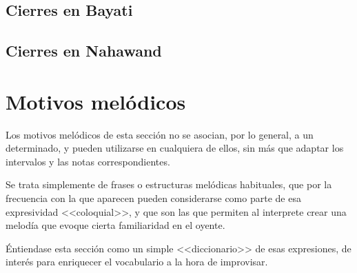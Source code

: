 \subsection{Cierres en \maqam Bayati}
\subsection{Cierres en \maqam Nahawand}

\section{Motivos melódicos}

Los motivos melódicos de esta sección no se asocian, por lo general, a un \maqam determinado, y pueden utilizarse en cualquiera de ellos, sin más que adaptar los intervalos y las notas correspondientes.

Se trata simplemente de frases o estructuras melódicas habituales, que por la frecuencia con la que aparecen pueden considerarse como parte de esa expresividad <<coloquial>>, y que son las que permiten al interprete crear una melodía que evoque cierta familiaridad en el oyente.

Éntiendase esta sección como un simple <<diccionario>> de esas expresiones, de interés para enriquecer el vocabulario a la hora de improvisar.

